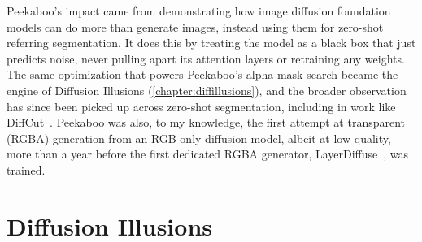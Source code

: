 Peekaboo's impact came from demonstrating how image diffusion foundation models can do more than generate images, instead using them for zero-shot referring segmentation. It does this by treating the model as a black box that just predicts noise, never pulling apart its attention layers or retraining any weights. The same optimization that powers Peekaboo's alpha-mask search became the engine of Diffusion Illusions (\cref{chapter:diffillusions}), and the broader observation has since been picked up across zero-shot segmentation, including in work like DiffCut~\cite{couairon2024diffcut}. Peekaboo was also, to my knowledge, the first attempt at transparent (RGBA) generation from an RGB-only diffusion model, albeit at low quality, more than a year before the first dedicated RGBA generator, LayerDiffuse~\cite{zhang2024layerdiffuse}, was trained.

\section{Diffusion Illusions}

